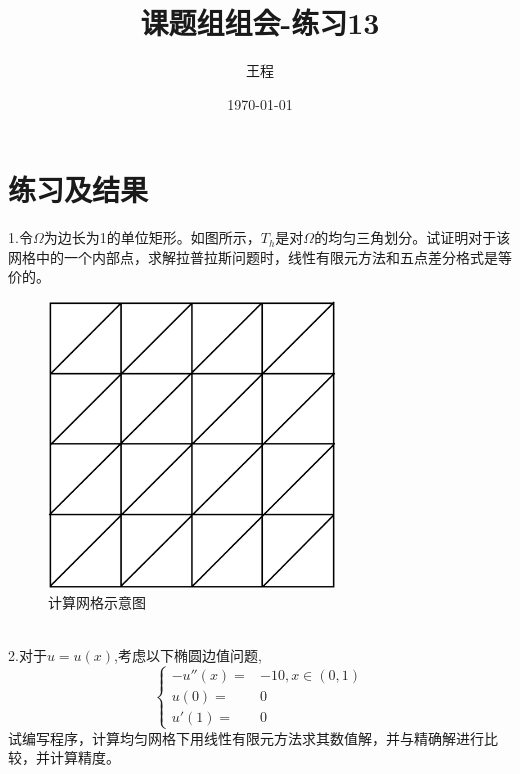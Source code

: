 \documentclass[a4paper,11pt,UTF8]{article}%
\theoremstyle{plain}
\begin{document}
	\title{\heiti 课题组组会-练习13}
	\author{王程 }
	\date{\today}
	\maketitle
	
	\section{练习及结果}
	1.令$\Omega$为边长为1的单位矩形。如图所示，$T_h$是对$\Omega$的均匀三角划分。试证明对于该网格中的一个内部点，求解拉普拉斯问题时，线性有限元方法和五点差分格式是等价的。\\
			\begin{figure}[H]
		\centering
		\includegraphics[width=3in]{计算网格示意图.png} 
		\caption{计算网格示意图}
	\end{figure}\leavevmode\\
	\indent 2.对于$u=u\left(x\right)$,考虑以下椭圆边值问题,\\
	$$\left\{
	\begin{aligned}
		-u''\left(x\right)=&-10,x\in \left(0,1\right)\\
		u\left(0\right)=&0\\
		u'\left(1\right)=&0
	\end{aligned}
	\right.$$
	\indent 试编写程序，计算均匀网格下用线性有限元方法求其数值解，并与精确解进行比较，并计算精度。\\
	
	
	
\end{document}
